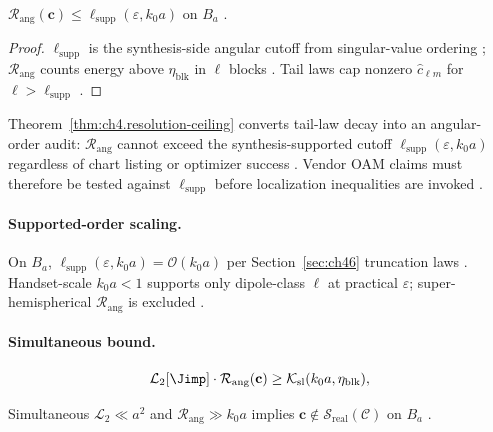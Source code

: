 \begin{theorem}
\label{thm:ch4.resolution-ceiling}
\(\mathcal{R}_{\mathrm{ang}}(\mathbf{c})\le\ell_{\mathrm{supp}}(\varepsilon,k_{0}a)\) on \(B_{a}\) \cite{hansen1988,stratton1941,devaney2004,harrington2001}.
\end{theorem}
\begin{proof}
\(\ell_{\mathrm{supp}}\) is the synthesis-side angular cutoff from singular-value ordering \cite{harrington2001}; \(\mathcal{R}_{\mathrm{ang}}\) counts
energy above \(\eta_{\mathrm{blk}}\) in \(\ell\) blocks \cite{hansen1988,stratton1941}. Tail laws cap nonzero \(\widehat{c}_{\ell m}\) for
\(\ell>\ell_{\mathrm{supp}}\) \cite{devaney2004,jackson1999}.
\end{proof}

Theorem~\ref{thm:ch4.resolution-ceiling} converts tail-law decay into an angular-order audit: \(\mathcal{R}_{\mathrm{ang}}\) cannot exceed the
synthesis-supported cutoff \(\ell_{\mathrm{supp}}(\varepsilon,k_{0}a)\) regardless of chart listing or optimizer success \cite{hansen1988,harrington2001,stratton1941}.
Vendor OAM claims must therefore be tested against \(\ell_{\mathrm{supp}}\) before localization inequalities are invoked \cite{devaney2004,jackson1999}.

\paragraph{Supported-order scaling.}
On \(B_{a}\), \(\ell_{\mathrm{supp}}(\varepsilon,k_{0}a)=\mathcal{O}(k_{0}a)\) per Section~\ref{sec:ch46} truncation laws \cite{hansen1988,harrington2001}.
Handset-scale \(k_{0}a<1\) supports only dipole-class \(\ell\) at practical \(\varepsilon\); super-hemispherical \(\mathcal{R}_{\mathrm{ang}}\) is excluded
\cite{jackson1999,stratton1941,devaney2004}.

\paragraph{Simultaneous bound.}
\begin{equation}
\label{eq:ch4.simultaneous-loc-ell}
\mathcal{L}_{2}[\Jimp]\cdot\mathcal{R}_{\mathrm{ang}}(\mathbf{c})\ge\mathcal{K}_{\mathrm{sl}}(k_{0}a,\eta_{\mathrm{blk}}),
\end{equation}
\begin{corollary}
\label{cor:ch4.super-resolution-obstruction}
Simultaneous \(\mathcal{L}_{2}\ll a^{2}\) and \(\mathcal{R}_{\mathrm{ang}}\gg k_{0}a\) implies \(\mathbf{c}\notin\mathcal{S}_{\mathrm{real}}(\mathcal{C})\) on \(B_{a}\)
\cite{hansen1988,stratton1941,devaney2004,jackson1999}.
\end{corollary}


